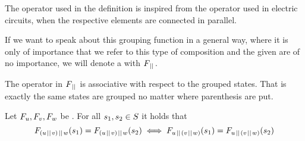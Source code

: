 \documentclass[preview]{standalone}
\begin{document}
The operator \pll used in the definition is inspired from the operator used in electric circuits, when the respective elements are connected in parallel.

If we want to speak about this grouping function in a general way, where it is only of importance that we refer to this type of composition and the given \grpfctsN are of no importance, we will denote a \emph{\parllcompN \grpfctN} with $\grpfct[\pll]$.

The operator \pll in $\grpfct[\pll]$ is associative with respect to the grouped states. That is exactly the same states are grouped no matter where parenthesis are put.
\begin{proposition}
	Let $\grpfct[u], \grpfct[v], \grpfct[w]$ be \grpfctsN. For all $\state_1, \state_2 \in \states$ it holds that
	\[
	\grpfct[(u \pll v) \pll w](\state_1) = \grpfct[(u \pll v) \pll w](\state_2) \iff \grpfct[u \pll (v \pll w)](\state_1) = \grpfct[u \pll (v \pll w)](\state_2)
	\]
\end{proposition}
\end{document}
